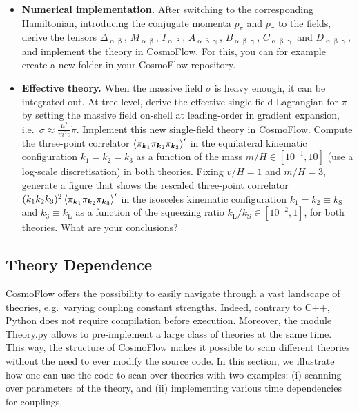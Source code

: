 \documentclass[11pt]{article}
\numberwithin{equation}{section} %
\begin{document}
\begin{framed}
{\begin{itemize}
    \item \textbf{Numerical implementation.} After switching to the corresponding Hamiltonian, introducing the conjugate momenta $p_\pi$ and $p_\sigma$ to the fields, derive the tensors $\Delta_{\upalpha\upbeta}$, $M_{\upalpha\upbeta}$, $I_{\upalpha\upbeta}$, $A_{\upalpha\upbeta\upgamma}$, $B_{\upalpha\upbeta\upgamma}$, $C_{\upalpha\upbeta\upgamma}$ and $D_{\upalpha\upbeta\upgamma}$, and implement the theory in \textsf{CosmoFlow}. For this, you can for example create a new folder in your \textsf{CosmoFlow} repository.
    \item \textbf{Effective theory.} When the massive field $\sigma$ is heavy enough, it can be integrated out. At tree-level, derive the effective single-field Lagrangian for $\pi$ by setting the massive field on-shell at leading-order in gradient expansion, i.e.~$\sigma \approx \tfrac{\mu^2}{m^2 v}\dot{\pi}$. Implement this new single-field theory in \textsf{CosmoFlow}. Compute the three-point correlator $\braket{\pi_{\bm{k}_1} \pi_{\bm{k}_2} \pi_{\bm{k}_3}}'$ in the equilateral kinematic configuration $k_1=k_2=k_3$ as a function of the mass $m/H\in[10^{-1}, 10]$ (use a log-scale discretisation) in both theories. Fixing $v/H=1$ and $m/H=3$, generate a figure that shows the rescaled three-point correlator $(k_1k_2k_3)^2\braket{\pi_{\bm{k}_1} \pi_{\bm{k}_2} \pi_{\bm{k}_3}}'$ in the isosceles kinematic configuration $k_1=k_2\equiv k_{\text{S}}$ and $k_3 \equiv k_{\text{L}}$ as a function of the squeezing ratio $k_{\text{L}}/k_{\text{S}} \in [10^{-2}, 1]$, for both theories. What are your conclusions?
\end{itemize}
}
\end{framed}

\subsection{Theory Dependence} 

\textsf{CosmoFlow} offers the possibility to easily navigate through a vast landscape of theories, e.g.~varying coupling constant strengths. Indeed, contrary to C++, Python does not require compilation before execution. Moreover, the module \textsf{Theory.py} allows to pre-implement a large class of theories at the same time. This way, the structure of \textsf{CosmoFlow} makes it possible to scan different theories without the need to ever modify the source code. In this section, we illustrate how one can use the code to scan over theories with two examples: (i) scanning over parameters of the theory, and (ii) implementing various time dependencies for couplings.
\end{document}
